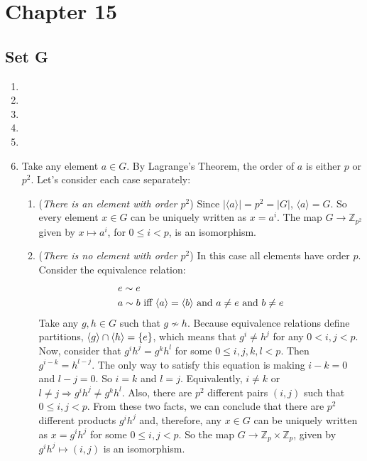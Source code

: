 \section{Chapter 15}
\subsection{Set G}
\begin{enumerate}
    \item 
    \item 
    \item 
    \item 
    \item 
    \item Take any element $a \in G$. By Lagrange's Theorem, the order of $a$ is either $p$ or $p^2$. Let's consider each case separately:
    \begin{enumerate}
        \item (\emph{There is an element with order $p^2$}) Since $|\langle a\rangle| = p^2 = |G|$, $\langle a\rangle = G$. So every element $x \in G$ can be uniquely written as $x = a^i$. The map $G \to \mathbb{Z}_{p^2}$ given by $x \mapsto a^i$, for $0 \leqslant i < p$, is an isomorphism.
        \item (\emph{There is no element with order $p^2$}) In this case all elements have order $p$. Consider the equivalence relation:
        \begin{align*} 
            e \sim e &\\ 
            a \sim b &\ \text{iff $\langle a\rangle = \langle b\rangle$ and $a \ne e$ and $b \ne e$}
        \end{align*}
        Take any $g, h \in G$ such that $g \nsim h$. Because equivalence relations define partitions, $\langle g\rangle \cap \langle h\rangle = \{e\}$, which means that $g^i \ne h^j$ for any $0 < i, j < p$. Now, consider that $g^ih^j = g^kh^l$ for some $0 \leqslant i, j, k, l < p$. Then $g^{i - k} = h^{l - j}$. The only way to satisfy this equation is making $i - k = 0$ and $l - j = 0$. So $i = k$ and $l = j$. Equivalently, $i \ne k$ or $l \ne j \Rightarrow g^ih^j \ne g^kh^l$. Also, there are $p^2$ different pairs $(i, j)$ such that $0 \leqslant i, j < p$. From these two facts, we can conclude that there are $p^2$ different products $g^ih^j$  and, therefore,  any $x \in G$ can be uniquely written as $x = g^ih^j$ for some $0 \leqslant i, j < p$. So the map $G \to \mathbb{Z}_p \times \mathbb{Z}_p$, given by $g^ih^j \mapsto (i, j)$ is an isomorphism.
    \end{enumerate}
\end{enumerate}

